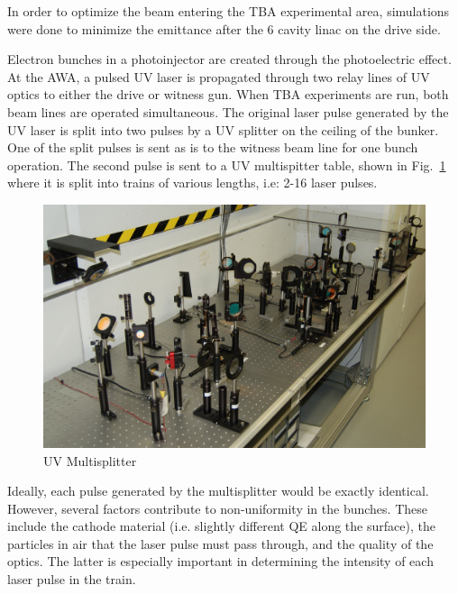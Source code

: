 \documentclass{iitthesis}
\begin{document}
 \label{sec:pareto}
In order to optimize the beam entering the TBA experimental area, 
simulations were done to minimize the emittance after the 6 cavity linac
on the drive side. 



 \label{sec:uvoptics}

Electron bunches in a photoinjector are created through the photoelectric effect. 
At the AWA, a pulsed UV laser is propagated through two relay lines of UV optics to either
the drive or witness gun. When TBA experiments are run, both beam lines are operated simultaneous.
The original laser pulse generated by the UV laser is split into two pulses by a UV splitter on the 
ceiling of the bunker. One of the split pulses is sent as is to the witness beam line for one
bunch operation. The second pulse is sent to a UV multispitter table, shown in 
Fig.~\ref{fig:multisplit} where it is split into trains of various lengths, i.e: 2-16 laser pulses. 
\begin{figure}[h]
	\begin{center}
		\includegraphics[scale=0.5]{images/multisplitter}\caption{UV Multisplitter}
	\end{center}
	\label{fig:multisplit}
\end{figure}
Ideally, each pulse generated by the multisplitter would be exactly identical. However, 
several factors contribute to non-uniformity in the bunches. These include the cathode material
(i.e. slightly different QE along the surface), the particles in air that the laser 
pulse must pass through, and the quality of the optics. The latter is especially important 
in determining the intensity of each laser pulse in the train.  
\end{document}
